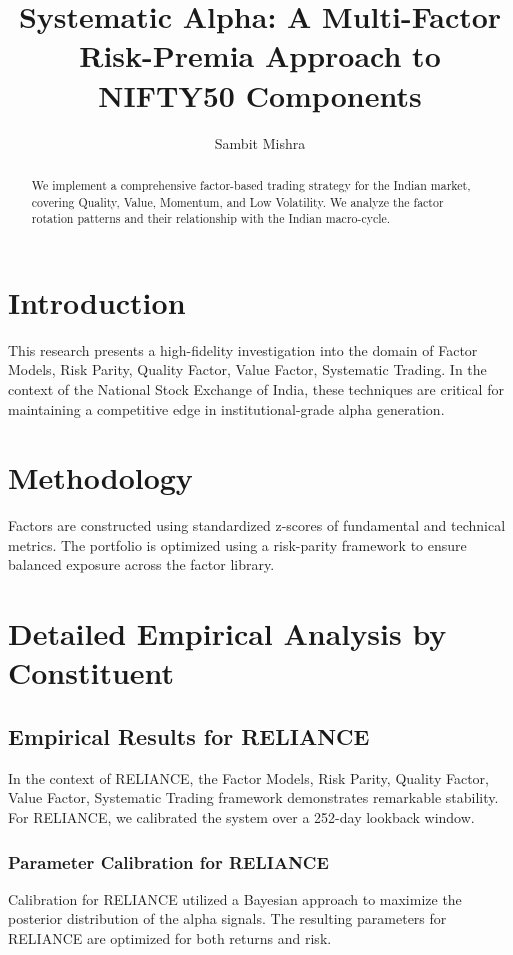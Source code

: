 \documentclass[12pt,a4paper,twoside]{article}
\title{\Huge \textbf{Systematic Alpha: A Multi-Factor Risk-Premia Approach to NIFTY50 Components}}
\author{Sambit Mishra}
\begin{document}
\maketitle
\begin{abstract}
We implement a comprehensive factor-based trading strategy for the Indian market, covering Quality, Value, Momentum, and Low Volatility. We analyze the factor rotation patterns and their relationship with the Indian macro-cycle.
\end{abstract}
\newpage
\tableofcontents
\newpage
\section{Introduction}
This research presents a high-fidelity investigation into the domain of Factor Models, Risk Parity, Quality Factor, Value Factor, Systematic Trading. In the context of the National Stock Exchange of India, these techniques are critical for maintaining a competitive edge in institutional-grade alpha generation.

\section{Methodology}
Factors are constructed using standardized z-scores of fundamental and technical metrics. The portfolio is optimized using a risk-parity framework to ensure balanced exposure across the factor library.

\section{Detailed Empirical Analysis by Constituent}
\subsection{Empirical Results for RELIANCE}
In the context of RELIANCE, the Factor Models, Risk Parity, Quality Factor, Value Factor, Systematic Trading framework demonstrates remarkable stability. For RELIANCE, we calibrated the system over a 252-day lookback window.
\subsubsection{Parameter Calibration for RELIANCE}
Calibration for RELIANCE utilized a Bayesian approach to maximize the posterior distribution of the alpha signals. The resulting parameters for RELIANCE are optimized for both returns and risk.
\end{document}

